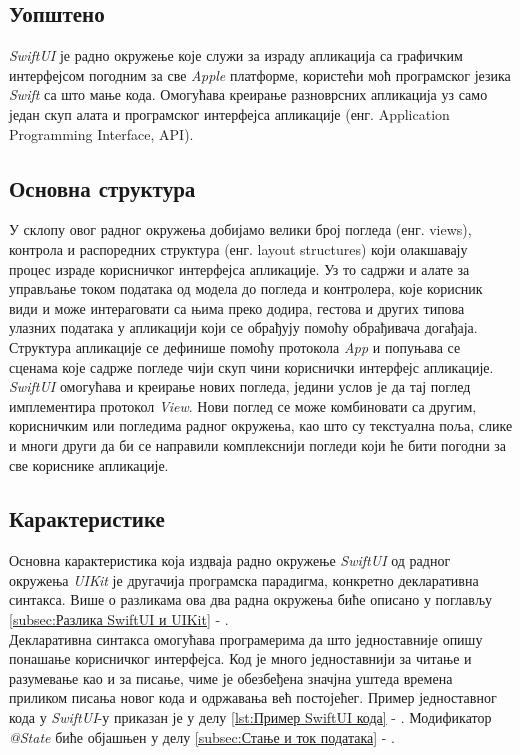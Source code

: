 \documentclass[12pt,oneside]{memoir}
\begin{document}
\subsection{Уопштено}

\indent \textit{SwiftUI} је радно окружење које служи за израду апликација са графичким интерфејсом погодним за све \textit{Apple} платформе, користећи моћ програмског језика \textit{Swift} са што мање кода. Омогућава креирање разноврсних апликација уз само један скуп алата и програмског интерфејса апликације (енг. Application Programming Interface, API). 

\subsection{Основна структура}

\indent У склопу овог радног окружења добијамо велики број погледа (енг. views), контрола и распоредних структура (енг. layout structures) који олакшавају процес израде корисничког интерфејса апликације. Уз то садржи и алате за управљање током података од модела до погледа и контролера, које корисник види и може интераговати са њима преко додира, гестова и других типова улазних података у апликацији који се обрађују помоћу обрађивача догађаја. 
\\
\indent Структура апликације се дефинише помоћу протокола \textit{App} и попуњава се сценама које садрже погледе чији скуп чини кориснички интерфејс апликације. \textit{SwiftUI} омогућава и креирање нових погледа, једини услов је да тај поглед имплементира протокол \textit{View}. Нови поглед се може комбиновати са другим, корисничким или погледима радног окружења, као што су текстуална поља, слике и многи други да би се направили комплекснији погледи који ће бити погодни за све кориснике апликације.

\subsection{Карактеристике}

\indent Основна карактеристика која издваја радно окружење \textit{SwiftUI} од радног окружења \textit{UIKit} је другачија програмска парадигма, конкретно декларативна синтакса. Више о разликама ова два радна окружења биће описано у поглављу \ref{subsec:Разлика SwiftUI и UIKit} - . 
\\
\indent Декларативна синтакса омогућава програмерима да што једноставније опишу понашање корисничког интерфејса. Код је много једноставнији за читање и разумевање као и за писање, чиме је обезбеђена значјна уштеда времена приликом писања новог кода и одржавања већ постојећег. Пример једноставног кода у \textit{SwiftUI}-у приказан је у делу \ref{lst:Пример SwiftUI кода} - . Модификатор \textit{@State} биће објашњен у делу \ref{subsec:Стање и ток података} - .
\end{document}
